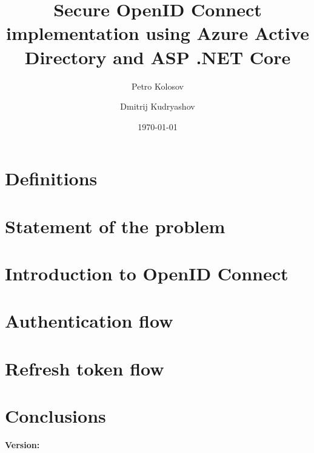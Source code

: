 \documentclass[12pt,letterpaper,oneside,reqno]{amsart}
\title[Secure OIDC implementation using Azure AD and ASP .NET Core]
{Secure OpenID Connect implementation using Azure Active Directory and ASP .NET Core}
\author[Petro Kolosov]{Petro Kolosov}
\author[Dmitrij Kudryashov]{Dmitrij Kudryashov}
\date{\today}
\numberwithin{equation}{section}
\begin{document}
    \begin{abstract}
        
    \end{abstract}

    \maketitle

    \tableofcontents


    \section{Definitions}\label{sec:definitions}
    


    \section{Statement of the problem}\label{sec:statement-of-the-problem}
    


    \section{Introduction to OpenID Connect}\label{sec:introduction-to-open-id-connect}
    


    \section{Authentication flow}\label{sec:authentication-flow}
    


    \section{Refresh token flow}\label{sec:refresh-token-flow}
    


    \section{Conclusions}\label{sec:conclusions}
    

    
    
    \noindent \textbf{Version:} 
\end{document}
